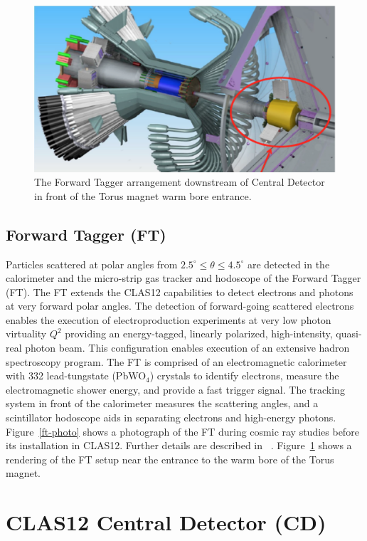 \documentclass[final,3p,twocolumn]{elsarticle}
\begin{document}
\begin{figure}[htbp!]
\centerline{\includegraphics[width=1.0\columnwidth]{CD-FT.png}}
\caption{The Forward Tagger arrangement downstream of Central Detector in front of the Torus magnet warm bore
entrance.}
\label{ft}
\end{figure}

\subsection{Forward Tagger (FT)}

Particles scattered at polar angles from $2.5^\circ \le \theta \le 4.5^\circ $ are detected in the calorimeter and the
micro-strip gas tracker and hodoscope of the Forward Tagger (FT). The FT extends the CLAS12 capabilities to detect 
electrons and photons at very forward polar angles. The detection of forward-going scattered electrons enables the
execution of electroproduction experiments at very low photon virtuality $Q^2$ providing an energy-tagged, linearly
polarized, high-intensity, quasi-real photon beam. This configuration enables execution of an extensive hadron spectroscopy
program. The FT is comprised of an electromagnetic calorimeter with 332 lead-tungstate (PbWO$_4$) crystals to identify
electrons,  measure the electromagnetic shower energy, and provide a fast trigger signal. The tracking system in front of
the calorimeter  measures the scattering angles, and a scintillator hodoscope aids in separating electrons and high-energy
photons. Figure~\ref{ft-photo} shows a photograph of the FT during cosmic ray studies before its installation in CLAS12.
Further details are described in ~\cite{FT}. Figure~\ref{ft} shows a rendering of the FT setup near the entrance to the
warm bore of the Torus magnet.   

\section{CLAS12 Central Detector (CD)} 
\end{document}
